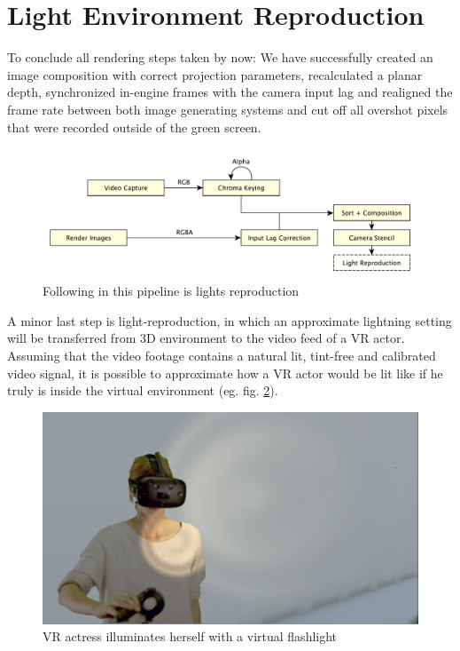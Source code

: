 %
\section{Light Environment Reproduction}

To conclude all rendering steps taken by now: We have successfully created an 
image composition with correct projection parameters, recalculated a planar 
depth, synchronized in-engine frames with the camera input lag and realigned 
the frame rate between both image generating systems and cut off all overshot 
pixels that were recorded outside of the green screen.

\begin{figure}[htb]
	\includegraphics[width=\textwidth]{gfx/pipeline/4_7_lights.pdf}
	\caption{Following in this pipeline is lights reproduction}
	\label{fig:steps:lights}
\end{figure}

A minor last step is light-reproduction, in which an approximate lightning 
setting will be transferred from 3D environment to the video feed of a VR 
actor. Assuming that the video footage contains a natural lit, tint-free and 
calibrated video signal, it is possible to approximate how a VR actor would 
be lit like if he truly is inside the virtual environment (eg. fig. 
\ref{fig:light-reconstruction:actor}).

\begin{figure}[htbp]
	\includegraphics[width=\textwidth]{gfx/recoloring/self-illu.png}
	\caption{VR actress illuminates herself with a virtual flashlight}
	\label{fig:light-reconstruction:actor}
\end{figure}

